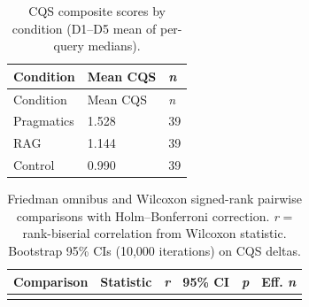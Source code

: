 \documentclass[
  11pt,
  letterpaper,
]{article}
\begin{document}
\begin{longtable}[]{@{}lll@{}}
\caption{CQS composite scores by condition (D1--D5 mean of per-query
medians).}\label{tbl-cqs-means}\tabularnewline
\toprule\noalign{}
Condition & Mean CQS & \emph{n} \\
\midrule\noalign{}
\endfirsthead
\toprule\noalign{}
Condition & Mean CQS & \emph{n} \\
\midrule\noalign{}
\endhead
\bottomrule\noalign{}
\endlastfoot
Pragmatics & 1.528 & 39 \\
RAG & 1.144 & 39 \\
Control & 0.990 & 39 \\
\end{longtable}

\begin{longtable}[]{@{}
  >{\raggedright\arraybackslash}p{}
  >{\raggedright\arraybackslash}p{}
  >{\raggedright\arraybackslash}p{}
  >{\raggedright\arraybackslash}p{}
  >{\raggedright\arraybackslash}p{}
  >{\raggedright\arraybackslash}p{}@{}}
\caption{Friedman omnibus and Wilcoxon signed-rank pairwise comparisons
with Holm--Bonferroni correction. \emph{r} = rank-biserial correlation
from Wilcoxon statistic. Bootstrap 95\% CIs (10,000 iterations) on CQS
deltas.}\label{tbl-pairwise}\tabularnewline
\toprule\noalign{}
\begin{minipage}[b]{\linewidth}\raggedright
Comparison
\end{minipage} & \begin{minipage}[b]{\linewidth}\raggedright
Statistic
\end{minipage} & \begin{minipage}[b]{\linewidth}\raggedright
\emph{r}
\end{minipage} & \begin{minipage}[b]{\linewidth}\raggedright
95\% CI
\end{minipage} & \begin{minipage}[b]{\linewidth}\raggedright
\emph{p}
\end{minipage} & \begin{minipage}[b]{\linewidth}\raggedright
Eff. \emph{n}
\end{minipage} \\
\midrule\noalign{}
\endfirsthead
\toprule\noalign{}
\begin{minipage}[b]{\linewidth}\raggedright

\end{minipage}
\end{longtable}
\end{document}
